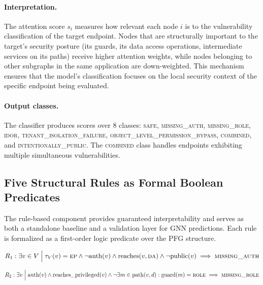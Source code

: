 \paragraph{Interpretation.} The attention score $s_i$ measures how relevant each node $i$ is to the vulnerability classification of the target endpoint. Nodes that are structurally important to the target's security posture (its guards, its data access operations, intermediate services on its paths) receive higher attention weights, while nodes belonging to other subgraphs in the same application are down-weighted. This mechanism ensures that the model's classification focuses on the local security context of the specific endpoint being evaluated.

\paragraph{Output classes.} The classifier produces scores over 8 classes: \textsc{safe}, \textsc{missing\_auth}, \textsc{missing\_role}, \textsc{idor}, \textsc{tenant\_isolation\_failure}, \textsc{object\_level\_permission\_bypass}, \textsc{combined}, and \textsc{intentionally\_public}. The \textsc{combined} class handles endpoints exhibiting multiple simultaneous vulnerabilities.

\subsection{Five Structural Rules as Formal Boolean Predicates}

The rule-based component provides guaranteed interpretability and serves as both a standalone baseline and a validation layer for GNN predictions. Each rule is formalized as a first-order logic predicate over the PFG structure.

\begin{definition}
\begin{equation}
R_1: \exists v \in V \;\Big|\; \tau_V(v) = \textsc{ep} \wedge \neg\text{auth}(v) \wedge \text{reaches}(v, \textsc{da}) \wedge \neg\text{public}(v) \implies \textsc{missing\_auth}
\end{equation}
\end{definition}

\begin{definition}
\begin{equation}
R_2: \exists v \;\Big|\; \text{auth}(v) \wedge \text{reaches\_privileged}(v) \wedge \neg\exists m \in \text{path}(v, d) : \text{guard}(m) = \textsc{role} \implies \textsc{missing\_role}
\end{equation}
\end{definition}

